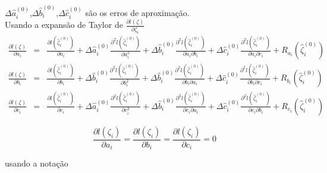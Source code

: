 	$\Delta\hat{a}_i^{(0)}$,$\Delta\hat{b}_i^{(0)}$,$\Delta\hat{c}_i^{(0)}$ são os erros de aproximação.\\
	Usando a expansão de Taylor de $\displaystyle\frac{\partial l(\zeta)}{\partial \zeta_i}$\\
	\begin{eqnarray}
		\displaystyle\frac{\partial l(\zeta)}{\partial a_i} & = & \displaystyle\frac{\partial l(\hat{\zeta}_i^{(0)})}{\partial a_i} + \Delta\hat{a}_i^{(0)} \displaystyle\frac{\partial^2 l(\hat{\zeta}_i^{(0)})}{\partial a_i^2} + \Delta\hat{b}_i^{(0)} \displaystyle\frac{\partial^2 l(\hat{\zeta}_i^{(0)})}{\partial a_i \partial b_i} + 
		\Delta\hat{c}_i^{(0)} \displaystyle\frac{\partial^2 l(\hat{\zeta}_i^{(0)})}{\partial a_i \partial c_i} + R_{a_i}(\hat{\zeta}_i^{(0)}) \nonumber\\
		\displaystyle\frac{\partial l(\zeta)}{\partial b_i} & = & \displaystyle\frac{\partial l(\hat{\zeta}_i^{(0)})}{\partial b_i} + \Delta\hat{b}_i^{(0)} \displaystyle\frac{\partial^2 l(\hat{\zeta}_i^{(0)})}{\partial b_i^2} + \Delta\hat{b}_i^{(0)} \displaystyle\frac{\partial^2 l(\hat{\zeta}_i^{(0)})}{\partial b_i \partial a_i} + \Delta\hat{c}_i^{(0)} \displaystyle\frac{\partial^2 l(\hat{\zeta}_i^{(0)})}{\partial b_i \partial c_i} + R_{b_i}(\hat{\zeta}_i^{(0)}) \nonumber\\
		\displaystyle\frac{\partial l(\zeta)}{\partial c_i} & = & \displaystyle\frac{\partial l(\hat{\zeta}_i^{(0)})}{\partial c_i} + \Delta\hat{a}_i^{(0)} \displaystyle\frac{\partial^2 l(\hat{\zeta}_i^{(0)})}{\partial c_i^2} + \Delta\hat{b}_i^{(0)} \displaystyle\frac{\partial^2 l(\hat{\zeta}_i^{(0)})}{\partial c_i \partial a_i } + \Delta\hat{c}_i^{(0)} \displaystyle\frac{\partial^2 l(\hat{\zeta}_i^{(0)})}{\partial c_i \partial b_i}+ R_{c_i}(\hat{\zeta}_i^{(0)}) \nonumber
	\end{eqnarray}
	
	$$
	\displaystyle\frac{\partial l(\zeta_i)}{\partial a_i} = \displaystyle\frac{\partial l(\zeta_i)}{\partial b_i} = \displaystyle\frac{\partial l(\zeta_i)}{\partial c_i} = 0
	$$
	
	usando a notação \\
	
